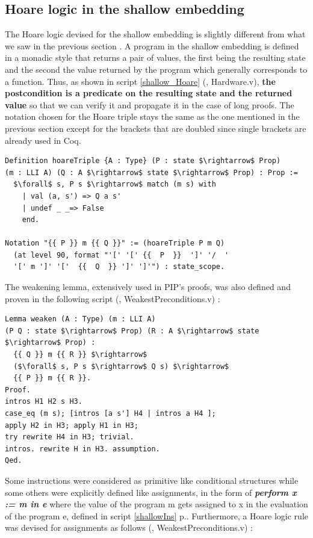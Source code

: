 \subsection{Hoare logic in the shallow embedding} \label{Hoare}
The Hoare logic devised for the shallow embedding is slightly different from what we saw in the previous section \cite{MMUIsolation}. A program in the shallow embedding is defined in a monadic style that returns a pair of values, the first being the resulting state and the second the value returned by the program which generally corresponds to a function. Thus, as shown in script \ref{shallow_Hoare} (\cite{PIP}, Hardware.v), \textbf{the postcondition is a predicate on the resulting state and the returned value} so that we can verify it and propagate it in the case of long proofs. The notation chosen for the Hoare triple stays the same as the one mentioned in the previous section except for the brackets that are doubled since single brackets are already used in Coq.
\begin{lstlisting}[caption = {Hoare triple in the shallow embedding},label = {shallow_Hoare}, mathescape=true,xleftmargin=.02\textwidth,
xrightmargin=.02\textwidth]
Definition hoareTriple {A : Type} (P : state $\rightarrow$ Prop) 
(m : LLI A) (Q : A $\rightarrow$ state $\rightarrow$ Prop) : Prop :=
  $\forall$ s, P s $\rightarrow$ match (m s) with
    | val (a, s') => Q a s'
    | undef _ _=> False
    end.

Notation "{{ P }} m {{ Q }}" := (hoareTriple P m Q)
  (at level 90, format "'[' '[' {{  P  }}  ']' '/  '
  '[' m ']' '['  {{  Q  }} ']' ']'") : state_scope.
\end{lstlisting}
The weakening lemma, extensively used in PIP's proofs, was also defined and proven in the following script (\cite{PIP}, WeakestPreconditions.v) :
\begin{lstlisting}[caption = {Weakening Hoare triples in the shallow embedding},label = {shallow_weaken}, mathescape=true,xleftmargin=.06\textwidth,
xrightmargin=.06\textwidth]
Lemma weaken (A : Type) (m : LLI A) 
(P Q : state $\rightarrow$ Prop) (R : A $\rightarrow$ state $\rightarrow$ Prop) :
  {{ Q }} m {{ R }} $\rightarrow$ 
  ($\forall$ s, P s $\rightarrow$ Q s) $\rightarrow$
  {{ P }} m {{ R }}.
Proof.
intros H1 H2 s H3.
case_eq (m s); [intros [a s'] H4 | intros a H4 ];
apply H2 in H3; apply H1 in H3; 
try rewrite H4 in H3; trivial.
intros. rewrite H in H3. assumption. 
Qed.
\end{lstlisting}
Some instructions were considered as primitive like conditional structures while some others were explicitly defined like assignments, in the form of \textit{\textbf{perform x := m in e}} where the value of the program m gets assigned to x in the evaluation of the program e, defined in script \ref{shallowIns} p.\pageref{shallowIns}. Furthermore, a Hoare logic rule was devised for assignments as follows (\cite{PIP}, WeakestPreconditions.v) :
